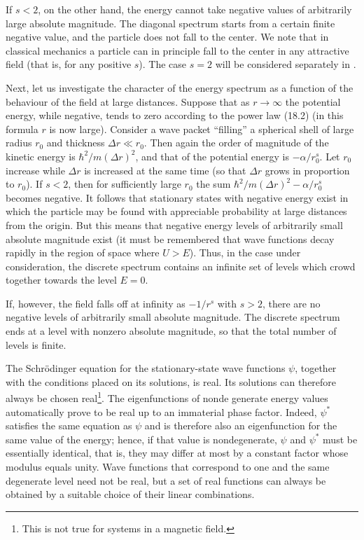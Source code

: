If $s<2$, on the other hand, the energy cannot take negative values of
arbitrarily large absolute magnitude. The diagonal spectrum starts from a certain
finite negative value, and the particle does not fall to the center.
We note that in classical mechanics a particle can in principle fall to the
center in any attractive field (that is, for any positive $s$). The case
$s=2$ will be considered separately in .

Next, let us investigate the character of the energy spectrum as a function of
the behaviour of the field at large distances. Suppose that as
$r\to\infty$ the potential energy, while negative, tends to zero according to
the power law (18.2) (in this formula $r$ is now large). Consider a wave packet
``filling'' a spherical shell of large radius $r_0$ and thickness
$\Delta r\ll r_0$. Then again the order of magnitude of the kinetic energy is
$\hbar^2/m{\left(\Delta r\right)}^2$, and that of the potential energy is
$-\alpha/r_0^s$. Let $r_0$ increase while $\Delta r$ is increased at the same
time (so that $\Delta r$ grows in proportion to $r_0$). If $s<2$, then for
sufficiently large $r_0$ the sum
$\hbar^2/m{\left(\Delta r\right)}^2-\alpha/r_0^s$ becomes negative. It follows
that stationary states with negative energy exist in which the particle may
be found with appreciable probability at large distances from the origin. But
this means that negative energy levels of arbitrarily small absolute magnitude
exist (it must be remembered that wave functions decay rapidly in the region
of space where $U>E$). Thus, in the case under consideration, the discrete
spectrum contains an infinite set of levels which crowd together towards the
level $E=0$.

If, however, the field falls off at infinity as $-1/r^s$ with $s>2$, there
are no negative levels of arbitrarily small absolute magnitude. The discrete
spectrum ends at a level with nonzero absolute magnitude, so that the total
number of levels is finite.

The Schrödinger equation for the stationary-state wave functions $\psi$, together
with the conditions placed on its solutions, is real. Its solutions can
therefore always be chosen real\footnote{This is not true for systems in a
magnetic field.}. The eigenfunctions of nonde%
generate energy values automatically prove to be real up to an immaterial
phase factor. Indeed, $\psi^*$ satisfies the same equation as $\psi$ and is
therefore also an eigenfunction for the same value of the energy; hence, if
that value is nondegenerate, $\psi$ and $\psi^*$ must be essentially
identical, that is, they may differ at most by a constant factor whose modulus
equals unity. Wave functions that correspond to one and the same degenerate level need
not be real, but a set of real functions can always be obtained by a suitable
choice of their linear combinations.

